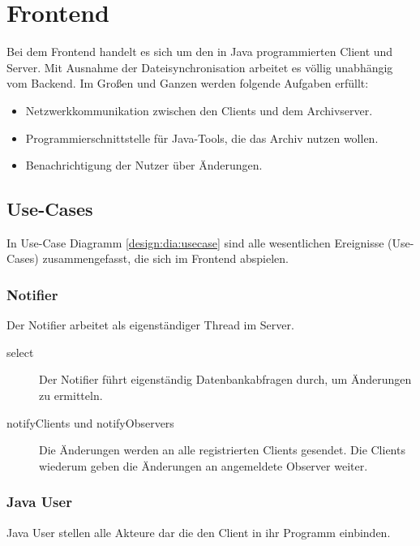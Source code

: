 \chapter{Frontend}
Bei dem Frontend handelt es sich um den in Java programmierten Client und Server.
Mit Ausnahme der Dateisynchronisation arbeitet es völlig unabhängig vom Backend.
Im Großen und Ganzen werden folgende Aufgaben erfüllt:
\begin{itemize}
	\item Netzwerkkommunikation zwischen den Clients und dem Archivserver.
	\item Programmierschnittstelle für Java-Tools, die das Archiv nutzen wollen.
	\item Benachrichtigung der Nutzer über Änderungen.
\end{itemize}
\section{Use-Cases}
In Use-Case Diagramm \ref{design:dia:usecase} sind alle wesentlichen Ereignisse (Use-Cases) zusammengefasst, die sich im Frontend abspielen.
\subsection{Notifier}
Der Notifier arbeitet als eigenständiger Thread im Server.
\begin{description}
	\item [select]
		Der Notifier führt eigenständig Datenbankabfragen durch,
		um Änderungen zu ermitteln.
	\item [notifyClients und notifyObservers]
		Die Änderungen werden an alle registrierten Clients gesendet.
		Die Clients wiederum geben die Änderungen an angemeldete Observer weiter.
\end{description}

\subsection{Java User}
Java User stellen alle Akteure dar die den Client in ihr Programm einbinden. 

